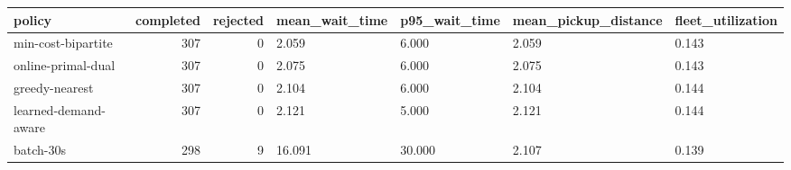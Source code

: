 \begin{tabular}{lrrllll}
\toprule
policy & completed & rejected & mean\_wait\_time & p95\_wait\_time & mean\_pickup\_distance & fleet\_utilization \\
\midrule
min-cost-bipartite & 307 & 0 & 2.059 & 6.000 & 2.059 & 0.143 \\
online-primal-dual & 307 & 0 & 2.075 & 6.000 & 2.075 & 0.143 \\
greedy-nearest & 307 & 0 & 2.104 & 6.000 & 2.104 & 0.144 \\
learned-demand-aware & 307 & 0 & 2.121 & 5.000 & 2.121 & 0.144 \\
batch-30s & 298 & 9 & 16.091 & 30.000 & 2.107 & 0.139 \\
\bottomrule
\end{tabular}
